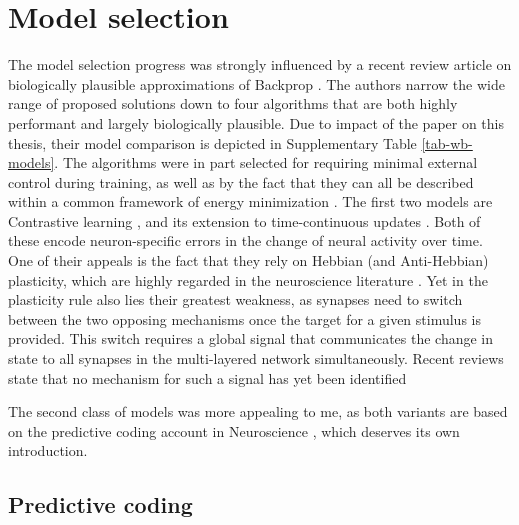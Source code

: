 \section{Model selection}\label{sec-model-selection}

The model selection progress was strongly influenced by a recent review article on biologically plausible approximations
of Backprop \citep{whittington2019theories}. The authors narrow the wide range of proposed solutions down to four
algorithms that are both highly performant and largely biologically plausible. Due to impact of the paper on this
thesis, their model comparison is depicted in Supplementary Table \ref{tab-wb-models}. The algorithms were in part
selected for requiring minimal external control during training, as well as by the fact that they can all be described
within a common framework of energy minimization \citep{Scellier2017}. The first two models are Contrastive learning
\citep{OReilly1996}, and its extension to time-continuous updates \citep{Bengio2017}. Both of these encode
neuron-specific errors in the change of neural activity over time. One of their appeals is the fact that they rely on
Hebbian (and Anti-Hebbian) plasticity, which are highly regarded in the neuroscience literature
\citep{magee2020synaptic,Brea2016}. Yet in the plasticity rule also lies their greatest weakness, as synapses need to
switch between the two opposing mechanisms once the target for a given stimulus is provided. This switch requires a
global signal that communicates the change in state to all synapses in the multi-layered network simultaneously. Recent
reviews state that no mechanism for such a signal has yet been identified
\citep{whittington2019theories,Richards2019}

The second class of models was more appealing to me, as both variants are based on the predictive coding account in
Neuroscience \citep{rao1999predictive}, which deserves its own introduction.

\subsection{Predictive coding}

